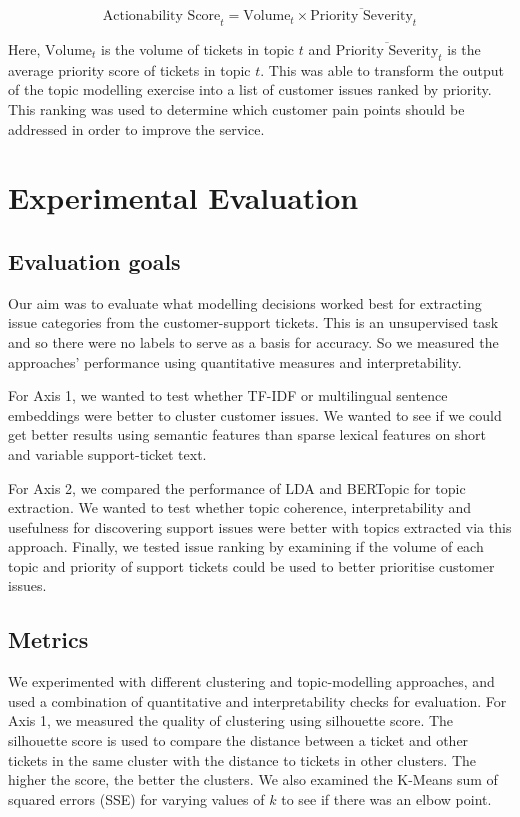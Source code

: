\documentclass[11pt]{article}
\begin{document}
\begin{equation}
\text{Actionability Score}_{t} = \text{Volume}_{t} \times \overline{\text{Priority Severity}}_{t}
\end{equation}

Here, $\text{Volume}_{t}$ is the volume of tickets in topic $t$ and $\overline{\text{Priority Severity}}_{t}$ is the average priority score of tickets in topic $t$. This was able to transform the output of the topic modelling exercise into a list of customer issues ranked by priority. This ranking was used to determine which customer pain points should be addressed in order to improve the service.

\section{Experimental Evaluation}

\subsection{Evaluation goals}

Our aim was to evaluate what modelling decisions worked best for extracting issue categories from the customer-support tickets. This is an unsupervised task and so there were no labels to serve as a basis for accuracy. So we measured the approaches' performance using quantitative measures and interpretability.

For Axis 1, we wanted to test whether TF-IDF or multilingual sentence embeddings were better to cluster customer issues. We wanted to see if we could get better results using semantic features than sparse lexical features on short and variable support-ticket text.

For Axis 2, we compared the performance of LDA and BERTopic for topic extraction. We wanted to test whether topic coherence, interpretability and usefulness for discovering support issues were better with topics extracted via this approach. Finally, we tested issue ranking by examining if the volume of each topic and priority of support tickets could be used to better prioritise customer issues.

\subsection{Metrics}

We experimented with different clustering and topic-modelling approaches, and used a combination of quantitative and interpretability checks for evaluation. For Axis 1, we measured the quality of clustering using silhouette score. The silhouette score is used to compare the distance between a ticket and other tickets in the same cluster with the distance to tickets in other clusters. The higher the score, the better the clusters. We also examined the K-Means sum of squared errors (SSE) for varying values of $k$ to see if there was an elbow point.
\end{document}
